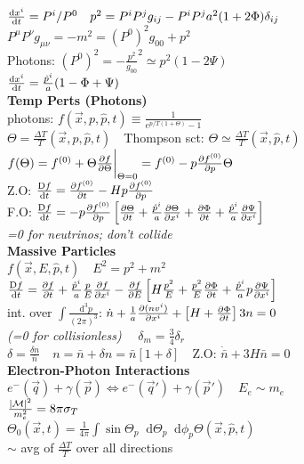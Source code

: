 \documentclass[12pt]{article}
\newcommand*\diff{\mathop{}\!\mathrm{d}}
\newcommand{\stint}{\int\frac{\diff^3 p}{(2\pi)^3}}
\newcommand{\evalat}[1]{\bigg\rvert_{#1}}
\newcommand{\Dv}{\frac{\text{D} f}{\diff t}}
\begin{document}
{	\\$\dv{x^i}{t}=P^i/P^0 \quad p^2=P^iP^jg_{ij}-P^iP^ja^2(1+2\Phi)\delta_{ij}$
	\\$P^\mu P^\nu g_{\mu\nu}=-m^2=(P^0)^2g_{00}+p^2$
	\\Photons: $(P^0)^2=-\frac{p^2}{g_{00}}^2\simeq p^2(1-2\Psi)$
	\\$\dv{x^i}{t}=\frac{\hat{p}^i}{a}(1-\Phi+\Psi)$
	\vspace{0.05cm}
	\\\textbf{Temp Perts (Photons)}
	\\photons: $f(\vec{x},p,\hat{p},t)\equiv\frac{1}{e^{p/T(1+\Theta)}-1}$
	\\$\Theta=\frac{\Delta T}{T}(\vec{x},p,\hat{p},t) \quad$Thompson sct: $\Theta\simeq\frac{\Delta T}{T}(\vec{x},\hat{p},t)$
	\\$f(\Theta)=f^{(0)}+\Theta\pdv{f}{\Theta}\evalat{\Theta=0}=f^{(0)}-p\pdv{f^{(0)}}{p}\Theta$
	\\Z.O: $\Dv=\pdv{f^{(0)}}{t}-Hp\pdv{f^{(0)}}{p}$
	\\F.O: $\Dv=-p\pdv{f^{(0)}}{p}\left[\pdv{\Theta}{t}+\frac{\hat{p}^i}{a}\pdv{\Theta}{x^i}+\pdv{\Phi}{t}+\frac{\hat{p}^i}{a}\pdv{\Psi}{x^i}\right]$
	\\\textit{=0 for neutrinos; don't collide}
	\\\textbf{Massive Particles}
	\\$f(\vec{x},E,\hat{p},t) \quad E^2=p^2+m^2$
	\\$\Dv=\pdv{f}{t}+\frac{\hat{p}^i}{a}\frac{p}{E}\pdv{f}{x^i}-\pdv{f}{E}\left[H\frac{p^2}{E}+\frac{p^2}{E}\pdv{\Phi}{t}+\frac{\hat{p}^i}{a}p\pdv{\Psi}{x^i}\right]$
	\\int. over $\stint$: $\dot{n}+\frac{1}{a}\pdv{(nv^i)}{x^i}+\left[H+\pdv{\Phi}{t}\right]3n=0$
	\\\textit{(=0 for collisionless)} $\quad \delta_m=\frac{3}{4}\delta_r$
	\\$\delta=\frac{\delta n}{\bar{n}} \quad n=\bar{n}+\delta n = \bar{n}[1+\delta] \quad$Z.O: $\dot{\bar{n}}+3H\bar{n}=0$
	\\\textbf{Electron-Photon Interactions}
	\\$e^-(\vec{q})+\gamma(\vec{p})\Leftrightarrow e^-(\vec{q}')+\gamma(\vec{p}') \quad E_e\sim m_e$
	\\$\frac{\abs{\mathcal{M}}^2}{m_e^2}=8\pi \sigma_T$
	\\$\Theta_0(\vec{x},t)=\frac{1}{4\pi}\int\sin\Theta_p\diff\Theta_p\diff\phi_p\Theta(\vec{x},\hat{p},t)$
	\\$\sim$ avg of $\frac{\Delta T}{T}$ over all directions
}
\end{document}
